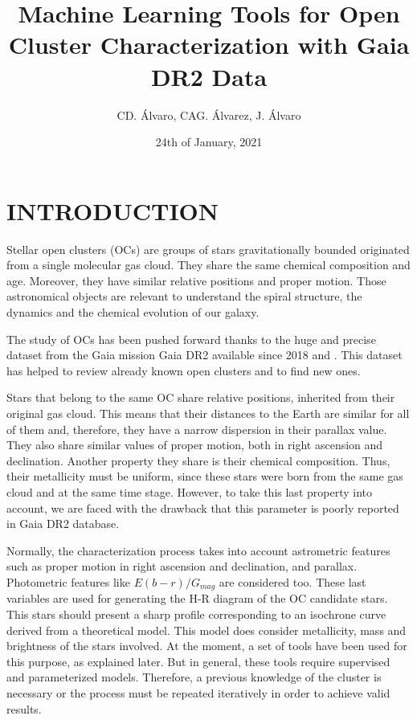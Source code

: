 \documentclass[11pt,a4paper,english,twocolumn]{article}
\title{Machine Learning Tools for Open Cluster Characterization with Gaia DR2 Data}
\author{CD. Álvaro, CAG. Álvarez, J. Álvaro}
\date{24th of January, 2021}
\begin{document}
\twocolumn[
\begin{@twocolumnfalse}
\maketitle
\end{@twocolumnfalse}
]




\section{INTRODUCTION}

Stellar open clusters (OCs) \cite{janes1982open} are groups of stars
gravitationally bounded originated from a single molecular gas cloud.
They share the same chemical composition and age. Moreover,
they have similar relative positions and proper motion.
Those astronomical objects are relevant to understand the spiral structure,
the dynamics and the chemical evolution of our galaxy.

The study of OCs has been pushed forward thanks to the huge and precise dataset
from the Gaia mission Gaia DR2 available since 2018
\cite{collaboration2016description} and \cite{gaia2018gaia}.
This dataset has helped to review already known open clusters and to find new ones.

Stars that belong to the same OC share relative positions,
inherited from their original gas cloud.
This means that their distances to the Earth are similar for all of them and,
therefore, they have a narrow dispersion in their parallax value.
They also share similar values of proper motion, both in right ascension and declination.
Another property they share is their chemical composition.
Thus, their metallicity must be uniform,
since these stars were born from the same gas cloud and at the same time stage.
However, to take this last property into account, we are faced with the drawback
that this parameter is poorly reported in Gaia DR2 database.

Normally, the characterization process takes into account astrometric features
such as proper motion in right ascension and declination, and parallax.
Photometric features like $E(b-r) / G_{mag}$ are considered too.
These last variables are used for generating the H-R diagram of the OC candidate stars.
This stars should present a sharp profile corresponding to an isochrone curve derived
from a theoretical model.
This model does consider metallicity, mass and brightness of the stars involved.
At the moment, a set of tools have been used for this purpose, as explained later.
But in general, these tools require supervised and parameterized models.
Therefore, a previous knowledge of the cluster is necessary or the process must be
repeated iteratively in order to achieve valid results.
\end{document}
